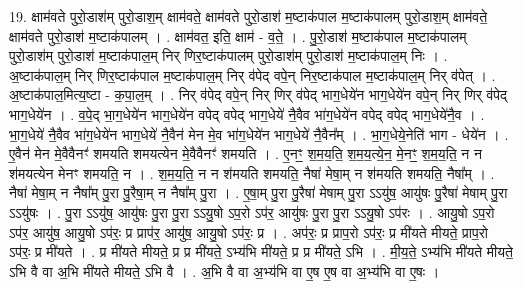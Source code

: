 \documentclass[17pt]{extarticle}
\begin{document}
19. क्षाम॑वते पुरो॒डाश॑म् पुरो॒डाश॒म् क्षाम॑वते॒ क्षाम॑वते पुरो॒डाश॑ म॒ष्टाक॑पाल म॒ष्टाक॑पालम् पुरो॒डाश॒म् क्षाम॑वते॒ क्षाम॑वते पुरो॒डाश॑ म॒ष्टाक॑पालम् । . क्षाम॑वत॒ इति॒ क्षाम॑ - व॒ते॒ । . पु॒रो॒डाश॑ म॒ष्टाक॑पाल म॒ष्टाक॑पालम् पुरो॒डाश॑म् पुरो॒डाश॑ म॒ष्टाक॑पाल॒म् निर् णिर॒ष्टाक॑पालम् पुरो॒डाश॑म् पुरो॒डाश॑ म॒ष्टाक॑पाल॒म् निः । . अ॒ष्टाक॑पाल॒म् निर् णिर॒ष्टाक॑पाल म॒ष्टाक॑पाल॒म् निर् व॑पेद् वपे॒न् निर॒ष्टाक॑पाल म॒ष्टाक॑पाल॒म् निर् व॑पेत् । . अ॒ष्टाक॑पाल॒मित्य॒ष्टा - क॒पा॒ल॒म् । . निर् व॑पेद् वपे॒न् निर् णिर् व॑पेद् भाग॒धेये॑न भाग॒धेये॑न वपे॒न् निर् णिर् व॑पेद् भाग॒धेये॑न । . व॒पे॒द् भा॒ग॒धेये॑न भाग॒धेये॑न वपेद् वपेद् भाग॒धेये॑ नै॒वैव भा॑ग॒धेये॑न वपेद् वपेद् भाग॒धेये॑नै॒व । . भा॒ग॒धेये॑ नै॒वैव भा॑ग॒धेये॑न भाग॒धेये॑ नै॒वैन॑ मेन मे॒व भा॑ग॒धेये॑न भाग॒धेये॑ नै॒वैन᳚म् । . भा॒ग॒धेये॒नेति॑ भाग - धेये॑न । . ए॒वैन॑ मेन मे॒वैवैनꣳ॑ शमयति शमयत्येन मे॒वैवैनꣳ॑ शमयति । . ए॒नꣳ॒॒ श॒म॒य॒ति॒ श॒म॒य॒त्ये॒न॒ मे॒नꣳ॒॒ श॒म॒य॒ति॒ न न श॑मयत्येन मेनꣳ शमयति॒ न । . श॒म॒य॒ति॒ न न श॑मयति शमयति॒ नैषा॑ मेषा॒म् न श॑मयति शमयति॒ नैषा᳚म् । . नैषा॑ मेषा॒म् न नैषा᳚म् पु॒रा पु॒रैषा॒म् न नैषा᳚म् पु॒रा । . ए॒षा॒म् पु॒रा पु॒रैषा॑ मेषाम् पु॒रा ऽऽयु॑ष॒ आयु॑षः पु॒रैषा॑ मेषाम् पु॒रा ऽऽयु॑षः । . पु॒रा ऽऽयु॑ष॒ आयु॑षः पु॒रा पु॒रा ऽऽयु॒षो ऽप॒रो ऽप॑र॒ आयु॑षः पु॒रा पु॒रा ऽऽयु॒षो ऽप॑रः । . आयु॒षो ऽप॒रो ऽप॑र॒ आयु॑ष॒ आयु॒षो ऽप॑रः॒ प्र प्राप॑र॒ आयु॑ष॒ आयु॒षो ऽप॑रः॒ प्र । . अप॑रः॒ प्र प्राप॒रो ऽप॑रः॒ प्र मी॑यते मीयते॒ प्राप॒रो ऽप॑रः॒ प्र मी॑यते । . प्र मी॑यते मीयते॒ प्र प्र मी॑यते॒ ऽभ्य॑भि मी॑यते॒ प्र प्र मी॑यते॒ ऽभि । . मी॒य॒ते॒ ऽभ्य॑भि मी॑यते मीयते॒ ऽभि वै वा अ॒भि मी॑यते मीयते॒ ऽभि वै । . अ॒भि वै वा अ॒भ्य॑भि वा ए॒ष ए॒ष वा अ॒भ्य॑भि वा ए॒षः । \newline
\end{document}
